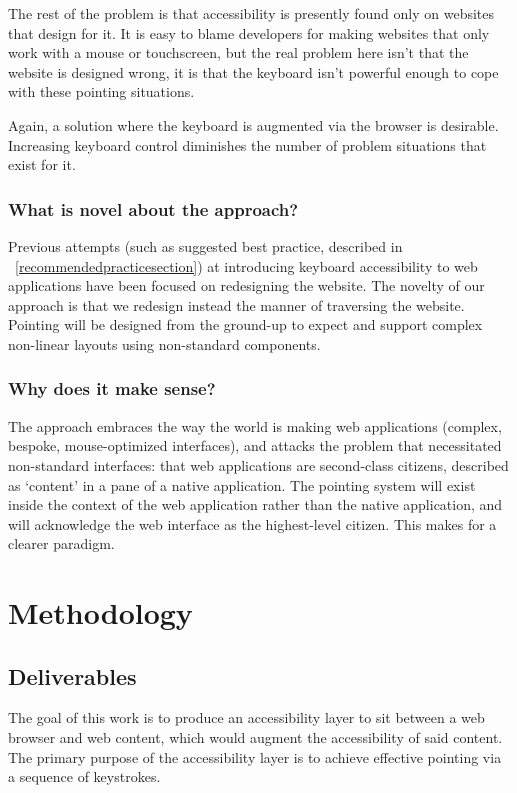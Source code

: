 \documentclass[11pt,openright,a4paper]{report}
\begin{document}
The rest of the problem is that accessibility is presently found only on websites that design for it. It is easy to blame developers for making websites that only work with a mouse or touchscreen, but the real problem here isn't that the website is designed wrong, it is that the keyboard isn't powerful enough to cope with these pointing situations.

Again, a solution where the keyboard is augmented via the browser is desirable. Increasing keyboard control diminishes the number of problem situations that exist for it.

\subsubsection{What is novel about the approach?}
Previous attempts (such as suggested best practice, described in ~\cref{recommendedpracticesection}) at introducing keyboard accessibility to web applications have been focused on redesigning the website. The novelty of our approach is that we redesign instead the manner of traversing the website. Pointing will be designed from the ground-up to expect and support complex non-linear layouts using non-standard components.
\subsubsection{Why does it make sense?}
The approach embraces the way the world is making web applications (complex, bespoke, mouse-optimized interfaces), and attacks the problem that necessitated non-standard interfaces: that web applications are second-class citizens, described as `content' in a pane of a native application.
The pointing system will exist inside the context of the web application rather than the native application, and will acknowledge the web interface as the highest-level citizen. This makes for a clearer paradigm.
\section{Methodology}
\subsection{Deliverables}
The goal of this work is to produce an accessibility layer to sit between a web browser and web content, which would augment the accessibility of said content.
The primary purpose of the accessibility layer is to achieve effective pointing via a sequence of keystrokes.
\end{document}
